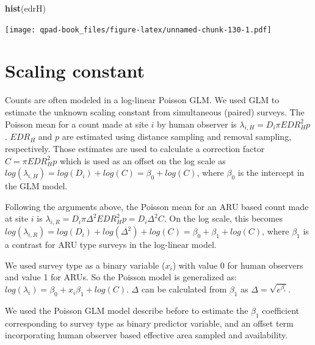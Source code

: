 \documentclass[12pt,]{book}
\newenvironment{Shaded}{\begin{snugshade}}{\end{snugshade}}
\newcommand{\KeywordTok}[1]{\textcolor[rgb]{0.13,0.29,0.53}{\textbf{#1}}}
\newcommand{\NormalTok}[1]{#1}
\begin{document}
\begin{Shaded}
\begin{Highlighting}[]
\KeywordTok{hist}\NormalTok{(edrH)}
\end{Highlighting}
\end{Shaded}

\texttt{[image: qpad-book\_files/figure-latex/unnamed-chunk-130-1.pdf]}

\hypertarget{scaling-constant}{%
\section{Scaling constant}\label{scaling-constant}}

Counts are often modeled in a log-linear Poisson GLM. We used GLM to estimate
the unknown scaling constant from simultaneous (paired) surveys. The Poisson mean
for a count made at site \(i\) by human observer is
\(\lambda_{i,H} = D_{i} \pi EDR_H^2 p\). \(EDR_H\) and \(p\) are estimated using distance
sampling and removal sampling, respectively. Those estimates are used to
calculate a correction factor \(C = \pi EDR_H^2 p\) which is used as an offset
on the log scale as \(log(\lambda_{i,H}) = log(D_{i}) + log(C) = \beta_0 + log(C)\),
where \(\beta_0\) is the intercept in the GLM model.

Following the arguments above, the Poisson mean for an ARU based count
made at site \(i\) is \(\lambda_{i,R} = D_{i} \pi \Delta^2 EDR_H^2 p = D_{i} \Delta^2 C\).
On the log scale, this becomes
\(log(\lambda_{i,R}) = log(D_{i}) + log(\Delta^2) + log(C) = \beta_0 + \beta_1 + log(C)\),
where \(\beta_1\) is a contrast for ARU type surveys in the log-linear model.

We used survey type as a binary variable (\(x_i\)) with value 0 for human observers
and value 1 for ARUs. So the Poisson model is generalized as:
\(log(\lambda_{i}) = \beta_0 + x_i \beta_1 + log(C)\). \(\Delta\) can be
calculated from \(\beta_1\) as \(\Delta = \sqrt{e^{\beta_i}}\).

We used the Poisson GLM model describe before to estimate the \(\beta_1\)
coefficient corresponding to survey type as binary predictor variable,
and an offset term incorporating human observer based effective area
sampled and availability.
\end{document}
